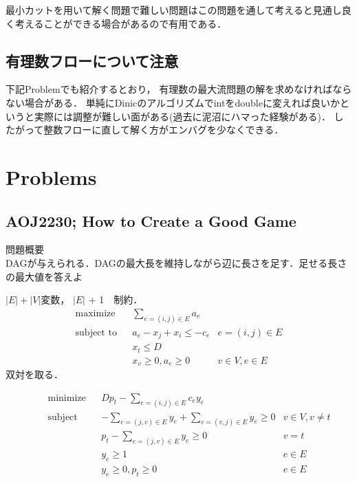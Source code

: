 \documentclass[13pt, a4paper, landscape]{jarticle}
\theoremstyle{nonitalic} %
\begin{document}
最小カットを用いて解く問題で難しい問題はこの問題を通して考えると見通し良く考えることができる場合があるので有用である．



\subsection{有理数フローについて注意}

下記Problemでも紹介するとおり， 有理数の最大流問題の解を求めなければならない場合がある． 単純にDinicのアルゴリズムでintをdoubleに変えれば良いかというと実際には調整が難しい面がある(過去に泥沼にハマった経験がある)． したがって整数フローに直して解く方がエンバグを少なくできる．



\section{Problems}

\subsection{AOJ2230; How to Create a Good Game}

問題概要 \\
DAGが与えられる．DAGの最大長を維持しながら辺に長さを足す．足せる長さの最大値を答えよ

$|E|+|V|$変数， $|E|$ + 1　制約．
\begin{align}
 &&&&&\textrm{maximize}   && \sum_{e = (i,j)\in E} a_e \\
 &&&&&\textrm{subject to} && a_e - x_j + x_i \leq - c_e & e = (i,j) \in E  &&&&&\\
 &&&&&                    && x_t \leq  D &&&&&& \\
 &&&&&                    && x_v \geq 0, a_e \geq 0 & v \in V, e \in E &&&&&
\end{align}
双対を取る．

\begin{align}
  &&&&& \textrm{minimize}   && Dp_t - \sum_{e = (i,j )\in E} c_e y_e \\
  &&&&& \textrm{subject to} && -\sum_{e=(j,v) \in E} y_e + \sum_{e=(v,j) \in E} y_e \geq 0 & v \in V, v\neq t &&&&&\\
  &&&&&                     && p_t - \sum_{e=(j,v) \in E} y_e \geq 0 & v=t \\
  &&&&&                     && y_e \geq 1  & e \in E\\
  &&&&&                     && y_e \geq 0, p_t \geq 0 & e\in E
\end{align}
\end{document}
